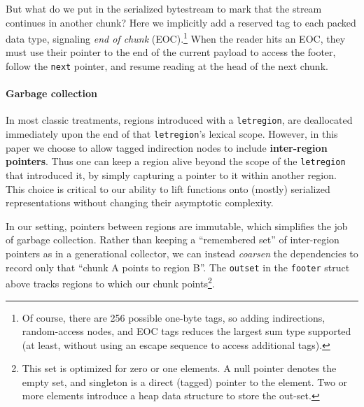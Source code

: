 \documentclass[showabstract,showacknowledgments,showpreface,showdedication]{iuphd}
\theoremstyle{nonumberplain}
\newcommand{\il}[1]{\lstinline[style=inline,mathescape=true];#1;}
\begin{document}
But what do we put in the serialized bytestream to mark that the stream
continues in another chunk?  Here we implicitly add a reserved tag to each
packed data type, signaling {\em end of chunk} (EOC).\footnote{Of course, there
  are 256 possible one-byte tags, so adding indirections, random-access nodes,
  and EOC tags reduces the largest sum type supported (at least, without using
  an escape sequence to access additional tags).}
%
When the reader hits an EOC, they must use their pointer to the end of the
current payload to access the footer, follow the \il{next} pointer, and resume
reading at the head of the next chunk.



\paragraph{Garbage collection}

In most classic treatments, regions introduced with a \il{letregion},
are deallocated immediately upon the end of that \il{letregion}'s lexical
scope.
%
However, in this paper we choose to allow tagged indirection nodes to include
{\bf inter-region pointers}.  Thus one can keep a region alive beyond the scope of the
\il{letregion} that introduced it, by simply capturing a pointer to it within
another region.
%
This choice is critical to our ability to lift functions onto (mostly)
serialized representations without changing their asymptotic complexity.

In our setting, pointers between regions are immutable, which simplifies the job of
garbage collection.  Rather than keeping a ``remembered set'' of inter-region pointers as
in a generational collector, we can instead \emph{coarsen} the dependencies to record only
that ``chunk A points to region B''.  The \il{outset} in the \il{footer} struct above
tracks regions to which our chunk points\footnote{This set is optimized for zero or one
  elements.  A null pointer denotes the empty set, and singleton is a direct (tagged)
  pointer to the element.  Two or more elements introduce a heap data structure to store
  the out-set.}.
\end{document}
